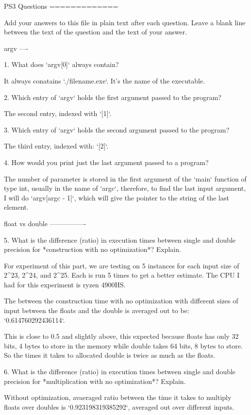 \documentclass[]{article}
\begin{document}
PS3 Questions
=============

Add your answers to this file in plain text after each question.  Leave a blank line between the text of the question and the text of your answer.

argv
----
 
1. What does `argv[0]` always contain?

It always conatains `./filename.exe`. It's the name of the executable. 

2. Which entry of `argv` holds the first argument passed to the program?

The second entry, indexed with `[1]`.

3. Which entry of `argv` holds the second argument passed to the program?

The third entry, indexed with: `[2]`.

4. How would you print just the last argument passed to a program?

The number of parameter is stored in the first argument of the `main` function of type int, usually in the name of `argc`, therefore, to find the last input argument, I will do `argv[argc - 1]`, which will give the pointer to the string of the last element. 

float vs double
----------------

5.  What is the difference (ratio) in execution times 
between single and double precision for    *construction with no optimization*? Explain.

For experiment of this part, we are testing on 5 instances for each input size of 2^23, 2^24, and 2^25. Each is run 5 times to get a better estimate. The CPU I had for this experiment is ryzen 4900HS. 

The between the construction time with no optimization with different sizes of input between the floats and the double is averaged out to be: `0.614760292436114`. 

This is close to 0.5 and slightly above, this expected because floats has only 32 bits, 4 bytes to store in the memory while double takes 64 bits, 8 bytes to store. So the times it takes to allocated double is twice as much as the floats.

6.  What is the difference (ratio) in execution times
between single and double precision for    *multiplication with no optimization*? Explain.

Without optimization, avaeraged ratio between the time it takes to multiply floats over doubles is `0.923198319385292`, averaged out over different inputs. 
\end{document}
